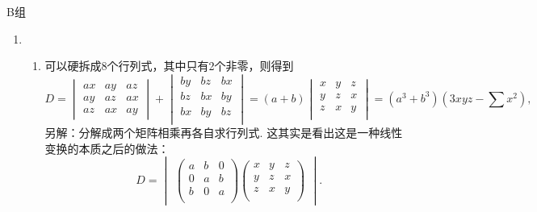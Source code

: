 \centerline{\heiti B组}
\begin{enumerate}
    \item \begin{enumerate}
              \item 可以硬拆成8个行列式，其中只有2个非零，则得到
                    \[D=\begin{vmatrix}
                            ax & ay & az \\
                            ay & az & ax \\
                            az & ax & ay
                        \end{vmatrix}+\begin{vmatrix}
                            by & bz & bx \\
                            bz & bx & by \\
                            bx & by & bz \\
                        \end{vmatrix}=(a+b)\begin{vmatrix}
                            x & y & z \\
                            y & z & x \\
                            z & x & y \\
                        \end{vmatrix}=(a^3+b^3)(3xyz-\sum x^2),\]
                    另解：分解成两个矩阵相乘再各自求行列式. 这其实是看出这是一种线性变换的本质之后的做法：
                    \[D=\begin{vmatrix}
                            \begin{pmatrix}
                                a & b & 0 \\
                                0 & a & b \\
                                b & 0 & a \\
                            \end{pmatrix}
                            \begin{pmatrix}
                                x & y & z \\
                                y & z & x \\
                                z & x & y \\
                            \end{pmatrix}
                        \end{vmatrix}.\]


\end{enumerate}
\end{enumerate}
